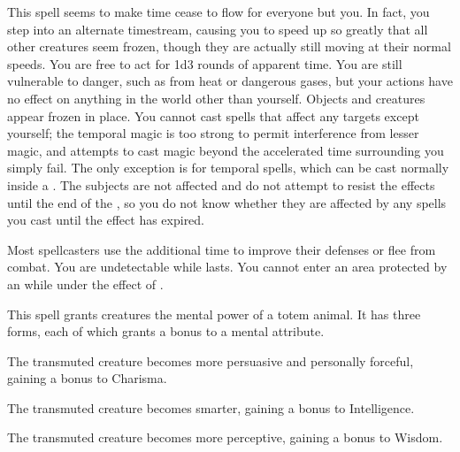 \begin{spelleffect}
  This spell seems to make time cease to flow for everyone but you. In fact, you step into an alternate timestream, causing you to speed up so greatly that all other creatures seem frozen, though they are actually still moving at their normal speeds. You are free to act for 1d3 rounds of apparent time. You are still vulnerable to danger, such as from heat or dangerous gases, but your actions have no effect on anything in the world other than yourself. Objects and creatures appear frozen in place. You cannot cast spells that affect any targets except yourself; the temporal magic is too strong to permit interference from lesser magic, and attempts to cast magic beyond the accelerated time surrounding you simply fail. The only exception is for temporal spells, which can be cast normally inside a . The subjects are not affected and do not attempt to resist the effects until the end of the , so you do not know whether they are affected by any spells you cast until the effect has expired.
\end{spelleffect}
\begin{spellnotes}
  Most spellcasters use the additional time to improve their defenses or flee from combat. You are undetectable while  lasts. You cannot enter an area protected by an  while under the effect of .
\end{spellnotes}

\spellrng{\rngclose}
\spelldur{\durshort}
\begin{spelleffect}
  This spell grants creatures the mental power of a totem animal. It has three forms, each of which grants a  bonus to a mental attribute. \bonusscalingdescription
  \par {} The transmuted creature becomes more persuasive and personally forceful, gaining a bonus to Charisma.
  \par {} The transmuted creature becomes smarter, gaining a bonus to Intelligence.
  \par {} The transmuted creature becomes more perceptive, gaining a bonus to Wisdom.
\end{spelleffect}

